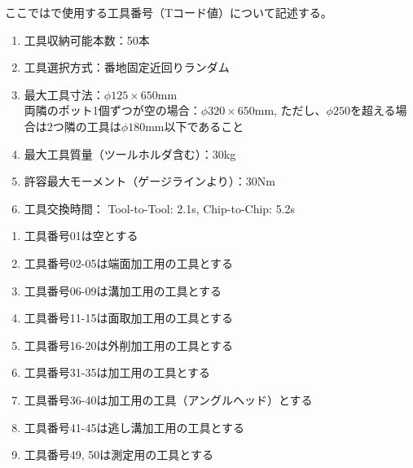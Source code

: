 

ここでは\DMname で使用する工具番号（Tコード値）について記述する。


\begin{enumerate}[label=\Roman*), ref=\Roman*)]
\item 工具収納可能本数：50本
\item 工具選択方式：番地固定近回りランダム
\item 最大工具寸法：$\phi125\times650$mm\\
両隣のポット1個ずつが空の場合：$\phi320\times650$mm, ただし、$\phi250$を超える場合は2つ隣の工具は$\phi180$mm以下であること
\item 最大工具質量（ツールホルダ含む）：30kg
\item 許容最大モーメント（ゲージラインより）：30Nm
\item 工具交換時間： Tool-to-Tool: 2.1s, Chip-to-Chip: 5.2s
\end{enumerate}

\begin{enumerate}[label=\Roman*), ref=\Roman*)]
\item 工具番号01は空とする
\item 工具番号02-05は端面加工用の工具とする
\item 工具番号06-09は溝加工用の工具とする
\item 工具番号11-15は面取加工用の工具とする
\item 工具番号16-20は外削加工用の工具とする
\item 工具番号31-35は\dimple 加工用の工具とする
\item 工具番号36-40は\dimple 加工用の工具（アングルヘッド）とする
\item 工具番号41-45は逃し溝加工用の工具とする
\item 工具番号49, 50は測定用の工具とする
\end{enumerate}



